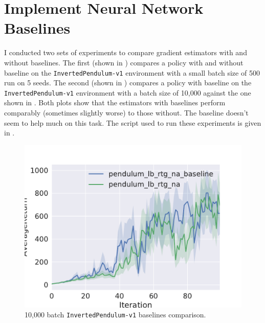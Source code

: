 \section{Implement Neural Network Baselines}
I conducted two sets of experiments to compare gradient estimators with and
without baselines. The first (shown in ) compares a
policy with and without baseline on the \texttt{InvertedPendulum-v1}
environment with a small batch size of 500 run on 5 seeds. The second (shown in
) compares a policy with baseline on the
\texttt{InvertedPendulum-v1} environment with a batch size of 10,000 against
the one shown in . Both plots show that the estimators with
baselines perform comparably (sometimes slightly worse) to those without. The
baseline doesn't seem to help much on this task. The script used to run these
experiments is given in .

\begin{figure}[h]
  \centering
  \includegraphics[width=\textwidth]{small_batch_pendulum_comparison.pdf}
  \caption{10,000 batch \texttt{InvertedPendulum-v1} baselines comparison.}
  \label{fig:baseline-small}
\end{figure}

